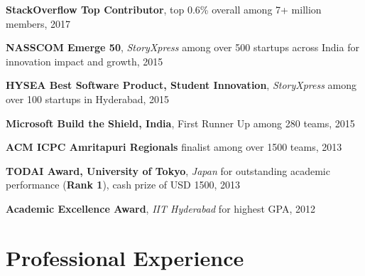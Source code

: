 \documentclass[margin,line]{res}
\begin{document}
\begin{resume}
  {\bf StackOverflow Top Contributor}, top 0.6\% overall among 7+ million members, 2017

  \vspace*{-3.5mm}

  {\bf NASSCOM Emerge 50}, {\it StoryXpress} among over 500 startups across India for innovation impact and growth, 2015

  \vspace*{-3.5mm}

  {\bf HYSEA Best Software Product, Student Innovation}, {\it StoryXpress} among over 100 startups in Hyderabad, 2015

  \vspace*{-3.5mm}

  {\bf Microsoft Build the Shield, India}, First Runner Up among 280 teams, 2015

  \vspace*{-3.5mm}

  \begin{comment}
  {\bf Best Science \& Technology Club}, Core Member, {\it Infero}, IIT Hyderabad for contributions to student community, 2014

  \vspace*{-3.5mm}
  \end{comment}

  {\bf ACM ICPC Amritapuri Regionals} finalist among over 1500 teams, 2013

  \vspace*{-3.5mm}

  {\bf TODAI Award, University of Tokyo}, {\it Japan} for outstanding academic performance ({\bf Rank 1}), cash prize of USD 1500, 2013

  \vspace*{-3.5mm}

  {\bf Academic Excellence Award}, {\it IIT Hyderabad} for highest GPA, 2012

  \vspace*{-3.5mm}

  \begin{comment}
  {\bf Top 0.5\%}, {\it IIT JEE} (0.5 million students) and {\bf Top 0.1\%}, {\it AIEEE} (1.2 million students), 2012

  \vspace*{-3.5mm}
  \end{comment}

\section{\sc Professional Experience}


\end{resume}
\end{document}
